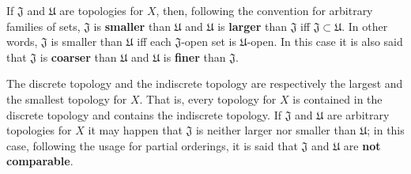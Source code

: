 If $\mathfrak{J}$ and $\mathfrak{U}$ are topologies for $X$, then, following the convention for arbitrary families of sets, $\mathfrak{J}$ is \textbf{smaller} than $\mathfrak{U}$ and $\mathfrak{U}$ is \textbf{larger} than $\mathfrak{J}$ iff $\mathfrak{J} \subset \mathfrak{U}$. In other words, $\mathfrak{J}$ is smaller than $\mathfrak{U}$ iff each $\mathfrak{J}$-open set is $\mathfrak{U}$-open. In this case it is also said that $\mathfrak{J}$ is \textbf{coarser} than $\mathfrak{U}$ and $\mathfrak{U}$ is \textbf{finer} than $\mathfrak{J}$.

The discrete topology and the indiscrete topology are respectively the largest and the smallest topology for $X$. That is, every topology for $X$ is contained in the discrete topology and contains the indiscrete topology. If $\mathfrak{J}$ and $\mathfrak{U}$ are arbitrary topologies for $X$ it may happen that $\mathfrak{J}$ is neither larger nor smaller than $\mathfrak{U}$; in this case, following the usage for partial orderings, it is said that $\mathfrak{J}$ and $\mathfrak{U}$ are \textbf{not comparable}.
